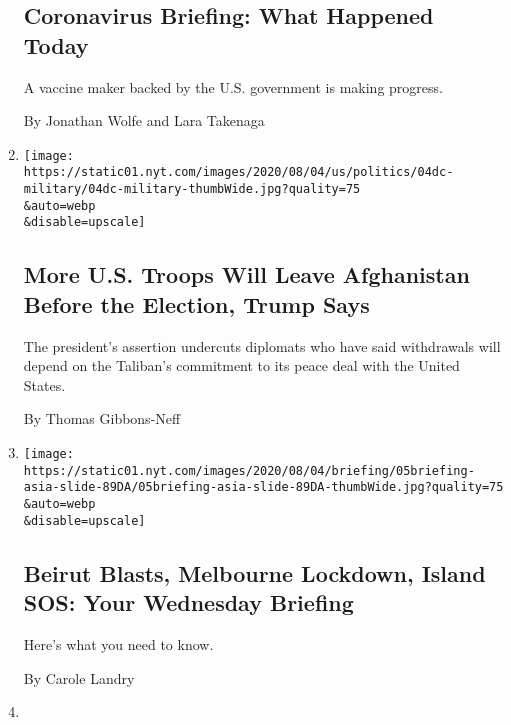 \begin{enumerate}
  \hypertarget{coronavirus-briefing-what-happened-today}{%
  \subsection{Coronavirus Briefing: What Happened
  Today}\label{coronavirus-briefing-what-happened-today}}

  A vaccine maker backed by the U.S. government is making progress.

  By Jonathan Wolfe and Lara Takenaga
\item
  \href{/2020/08/04/world/asia/us-troops-afghanistan.html}{}

  \texttt{[image: https://static01.nyt.com/images/2020/08/04/us/politics/04dc-military/04dc-military-thumbWide.jpg?quality=75\\\&auto=webp\\\&disable=upscale]}

  \hypertarget{more-us-troops-will-leave-afghanistan-before-the-election-trump-says}{%
  \subsection{More U.S. Troops Will Leave Afghanistan Before the
  Election, Trump
  Says}\label{more-us-troops-will-leave-afghanistan-before-the-election-trump-says}}

  The president's assertion undercuts diplomats who have said
  withdrawals will depend on the Taliban's commitment to its peace deal
  with the United States.

  By Thomas Gibbons-Neff
\item
  \href{/2020/08/04/briefing/beirut-explosion-melbourne-lockdown-pakistan.html}{}

  \texttt{[image: https://static01.nyt.com/images/2020/08/04/briefing/05briefing-asia-slide-89DA/05briefing-asia-slide-89DA-thumbWide.jpg?quality=75\\\&auto=webp\\\&disable=upscale]}

  \hypertarget{beirut-blasts-melbourne-lockdown-island-sos-your-wednesday-briefing}{%
  \subsection{Beirut Blasts, Melbourne Lockdown, Island SOS: Your
  Wednesday
  Briefing}\label{beirut-blasts-melbourne-lockdown-island-sos-your-wednesday-briefing}}

  Here's what you need to know.

  By Carole Landry
\item
  \href{/video/world/100000007272075/lebanon-beirut-blast.html}{}


\end{enumerate}
